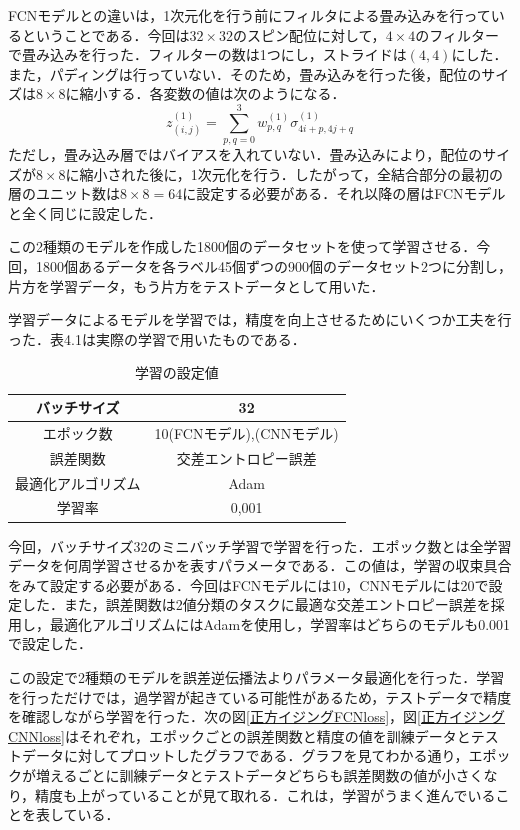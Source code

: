 \documentclass[a4paper,11pt]{jsreport}
\begin{document}
FCNモデルとの違いは，1次元化を行う前にフィルタによる畳み込みを行っているということである．今回は$32 \times 32$のスピン配位に対して，$4 \times 4$のフィルターで畳み込みを行った．フィルターの数は1つにし，ストライドは$(4,4)$にした．また，パディングは行っていない．そのため，畳み込みを行った後，配位のサイズは$8 \times 8$に縮小する．各変数の値は次のようになる．
\begin{equation}
  z_{(i,j)}^{(1)}
  = \sum_{p,q=0}^{3} w_{p,q}^{(1)} \sigma_{4i+p,4j+q}^{(1)}
\end{equation}
ただし，畳み込み層ではバイアスを入れていない．畳み込みにより，配位のサイズが$8 \times 8$に縮小された後に，1次元化を行う．したがって，全結合部分の最初の層のユニット数は$8 \times 8 = 64$に設定する必要がある．それ以降の層はFCNモデルと全く同じに設定した．\par
この2種類のモデルを作成した1800個のデータセットを使って学習させる．今回，1800個あるデータを各ラベル45個ずつの900個のデータセット2つに分割し，片方を学習データ，もう片方をテストデータとして用いた．\par
学習データによるモデルを学習では，精度を向上させるためにいくつか工夫を行った．表4.1は実際の学習で用いたものである．

\begin{table}[]
  \centering
  \begin{tabular}{cc} \hline
    バッチサイズ & 32 \rule[0pt]{0pt}{1pt} \\ \hline
    エポック数 & 10(FCNモデル),\quad 20(CNNモデル) \rule[0pt]{0pt}{1pt} \\ \hline
    誤差関数 & 交差エントロピー誤差 \rule[0pt]{0pt}{1pt} \\\hline
    最適化アルゴリズム & Adam \rule[0pt]{0pt}{1pt} \\\hline
    学習率 & 0,001 \rule[0pt]{0pt}{1pt} \\\hline
  \end{tabular}
  \caption{学習の設定値}
  \label{学習で用いたもの}
\end{table}

今回，バッチサイズ32のミニバッチ学習で学習を行った．エポック数とは全学習データを何周学習させるかを表すパラメータである．この値は，学習の収束具合をみて設定する必要がある．今回はFCNモデルには10，CNNモデルには20で設定した．また，誤差関数は2値分類のタスクに最適な交差エントロピー誤差を採用し，最適化アルゴリズムにはAdamを使用し，学習率はどちらのモデルも0.001で設定した．\par
この設定で2種類のモデルを誤差逆伝播法よりパラメータ最適化を行った．学習を行っただけでは，過学習が起きている可能性があるため，テストデータで精度を確認しながら学習を行った．次の図\ref{正方イジングFCNloss}，図\ref{正方イジングCNNloss}はそれぞれ，エポックごとの誤差関数と精度の値を訓練データとテストデータに対してプロットしたグラフである．グラフを見てわかる通り，エポックが増えるごとに訓練データとテストデータどちらも誤差関数の値が小さくなり，精度も上がっていることが見て取れる．これは，学習がうまく進んでいることを表している．
\end{document}
